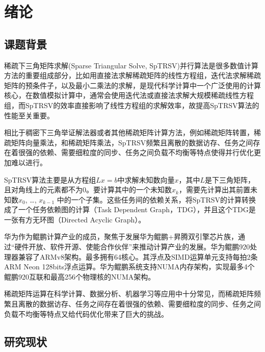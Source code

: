 \chapter{绪论}
\section{课题背景}

稀疏下三角矩阵求解(Sparse Triangular Solve, SpTRSV)并行算法是很多数值计算方法的重要组成部分，比如用直接法求解稀疏矩阵的线性方程组\cite{davis2006direct}，迭代法求解稀疏矩阵的预条件子\cite{elman1982iterative}，以及最小二乘法的求解\cite{saad2003iterative}，是现代科学计算中一个广泛使用的计算核心，在数值模拟计算中，通常会使用迭代法或直接法求解大规模稀疏线性方程组，而SpTRSV的效率直接影响了线性方程组的求解效率，故提高SpTRSV算法的性能至关重要。

相比于稠密下三角举证解法器\cite{hogg2013fast}或者其他稀疏矩阵计算方法，例如稀疏矩阵转置\cite{wang2016parallel}，稀疏矩阵向量乘法\cite{liu2015csr5}\cite{liu2015speculative}，和稀疏矩阵乘法\cite{liu2015framework}，SpTRSV频繁且离散的数据访存、任务之间存在着很强的依赖、需要细粒度的同步、任务之间负载不均衡等特点使得并行优化更加难以进行。

SpTRSV算法主要是从方程组$Lx=b$中求解未知数向量$ x $，其中$ L $是下三角矩阵，且对角线上的元素都不为0。要计算其中的一个未知数$x_k$，需要先计算出其前置未知数$x_0$, \dots, $x_{k-1}$ 中的一个子集。这些任务间的依赖关系，将SpTRSV的计算转换成了一个任务依赖图的计算（Task Dependent Graph，TDG），并且这个TDG是一张有方无环图（Directed Acyclic Graph）。

华为作为鲲鹏计算产业的成员，聚焦于发展华为鲲鹏+昇腾双引擎芯片族，通过“硬件开放、软件开源、使能合作伙伴”来推动计算产业的发展。华为鲲鹏920处理器兼容了ARMv8架构。最多拥有64核心。其浮点及SIMD运算单元支持每拍2条ARM Neon 128bits浮点运算。华为鲲鹏系统支持NUMA内存架构，实现最多4个鲲鹏920互联和最高256个物理核的NUMA架构。 

稀疏矩阵运算在科学计算、数据分析、机器学习等应用中十分常见，而稀疏矩阵频繁且离散的数据访存、任务之间存在着很强的依赖、需要细粒度的同步、任务之间负载不均衡等特点又给代码优化带来了巨大的挑战。


\section{研究现状}

\begin{figure}[htbp]
    \centering
    \centering
\end{figure}

